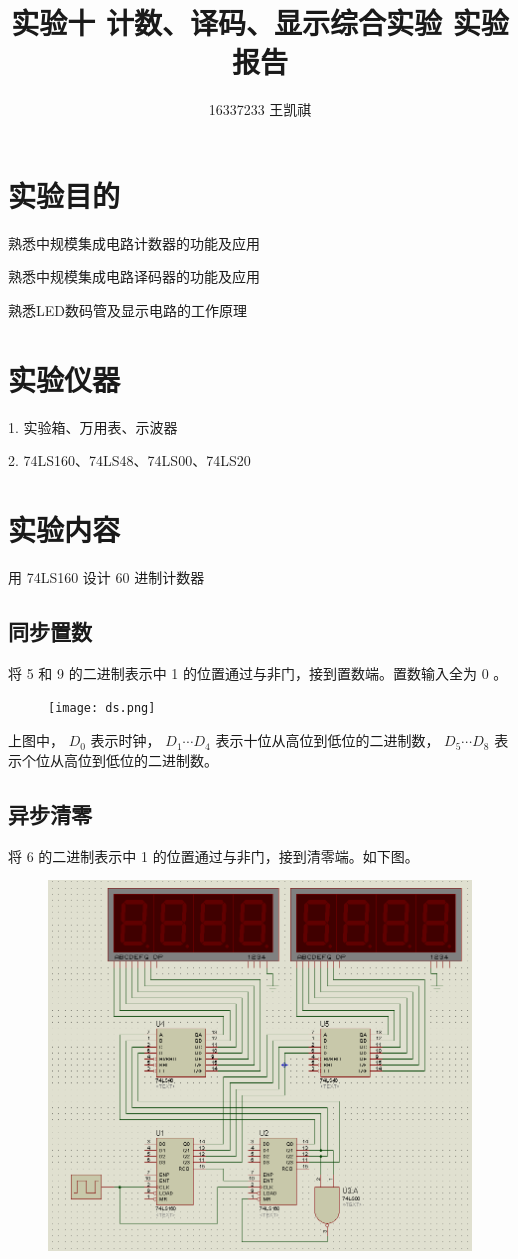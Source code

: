 \documentclass{article}
\begin{document}
\title{实验十 \text{ } 计数、译码、显示综合实验 \text{ } 实验报告}
\author {16337233 王凯祺}
\maketitle

\section{实验目的}

熟悉中规模集成电路计数器的功能及应用

熟悉中规模集成电路译码器的功能及应用

熟悉LED数码管及显示电路的工作原理

\section{实验仪器}

1. 实验箱、万用表、示波器

2. 74LS160、74LS48、74LS00、74LS20

\section{实验内容}

用 74LS160 设计 60 进制计数器

\subsection{同步置数}

将 5 和 9 的二进制表示中 1 的位置通过与非门，接到置数端。置数输入全为 0 。

\begin{figure}[!hbp]
  \centering
  \texttt{[image: ds.png]}
\end{figure}

上图中， $D_0$ 表示时钟， $D_1 \cdots D_4$ 表示十位从高位到低位的二进制数， $D_5 \cdots D_8$ 表示个位从高位到低位的二进制数。

\subsection{异步清零}

将 6 的二进制表示中 1 的位置通过与非门，接到清零端。如下图。

\begin{figure}[!hbp]
  \centering
  \includegraphics[scale=0.5]{ss.png}
\end{figure}
\end{document}
